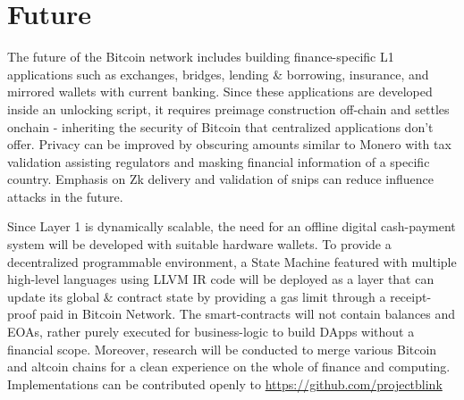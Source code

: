 \documentclass[../Bitcoin Blink.tex]{subfiles}
\begin{document}
\section{Future}

The future of the Bitcoin network includes building finance-specific L1 applications such as exchanges, bridges, lending \& borrowing, insurance, and mirrored wallets with current banking. Since these applications are developed inside an unlocking script, it requires preimage construction off-chain and settles onchain - inheriting the security of Bitcoin that centralized applications don't offer. Privacy can be improved by obscuring amounts similar to Monero with tax validation assisting regulators and masking financial information of a specific country. Emphasis on Zk delivery and validation of snips can reduce influence attacks in the future. 

Since Layer 1 is dynamically scalable, the need for an offline digital cash-payment system will be developed with suitable hardware wallets. To provide a decentralized programmable environment, a State Machine \cite{wood2014ethereum} featured with multiple high-level languages using LLVM \cite{llvm} IR code will be deployed as a layer that can update its global \& contract state by providing a gas limit through a receipt-proof paid in Bitcoin Network. The smart-contracts will not contain balances and EOAs, rather purely executed for business-logic to build DApps without a financial scope. Moreover, research will be conducted to merge various Bitcoin and altcoin chains for a clean experience on the whole of finance and computing.\\

\noindent Implementations can be contributed openly to \url{https://github.com/projectblink}
\end{document}
